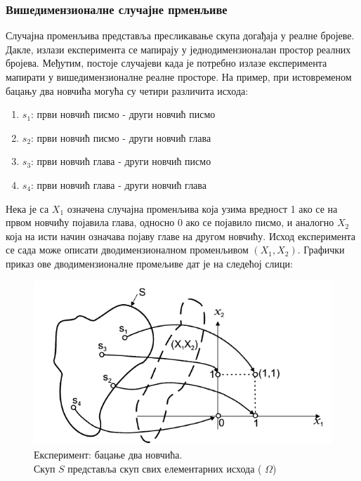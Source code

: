 \subsubsection{Вишедимензионалне случајне прменљиве}

Случајна променљива представља пресликавање скупа догађаја у реалне бројеве. Дакле, излази експеримента се мапирају у једнодимензионалан простор реалних бројева. Међутим, постоје случајеви када је потребно излазе експеримента мапирати у вишедимензионалне реалне просторе. На пример, при истовременом бацању два новчића могућа су четири различита исхода:
\begin{enumerate}
\item $s_1$: први новчић писмо - други новчић писмо
\item $s_2$: први новчић писмо - други новчић глава
\item $s_3$: први новчић глава - други новчић писмо
\item $s_4$: први новчић глава - други новчић глава
\end{enumerate}

Нека је са $X_1$ означена случајна променљива која узима вредност 1 ако се на првом новчићу појавила глава, односно 0 ако се појавило писмо, и аналогно $X_2$ која на исти начин означава појаву главе на другом новчићу. Исход експеримента се сада може описати дводимензионалном променљивом $(X_1,X_2)$. Графички приказ ове дводимензионалне промељиве дат је на следећој слици: %

\begin{figure}[H]
    \centering
\captionsetup{justification=centering}
   \includegraphics[scale=0.8]{./Slike/slika17.png} 
	\caption{Експеримент: бацање два новчића. \\ Скуп $S$ представља скуп свих елементарних исхода ( $\Omega$)} 
	\label{fig:slika17}
\end{figure}



